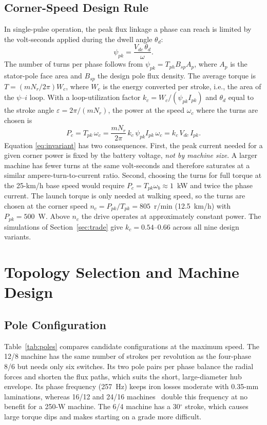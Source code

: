 \documentclass[journal]{IEEEtran}
\begin{document}
\subsection{Corner-Speed Design Rule}
\label{sec:corner}
In single-pulse operation, the peak flux linkage a phase can reach is limited by
the volt-seconds applied during the dwell angle $\theta_d$:
\begin{equation}
\psi_{pk} = \frac{V_{dc}\,\theta_d}{\omega}.
\label{eq:voltsec}
\end{equation}
The number of turns per phase follows from $\psi_{pk}=T_{ph}B_{sp}A_{p}$, where
$A_p$ is the stator-pole face area and $B_{sp}$ the design pole flux density.
The average torque is $T=(mN_r/2\pi)W_c$, where $W_c$ is the energy converted
per stroke, i.e., the area of the $\psi$--$i$ loop. With a loop-utilization
factor $k_c=W_c/(\psi_{pk}I_{pk})$ and $\theta_d$ equal to the stroke angle
$\varepsilon=2\pi/(mN_r)$, the power at the speed $\omega_c$ where the turns are
chosen is
\begin{equation}
P_c = T_{pk}\,\omega_c = \frac{mN_r}{2\pi}\,k_c\,\psi_{pk} I_{pk}\,\omega_c = k_c\,V_{dc}\,I_{pk}.
\label{eq:invariant}
\end{equation}
Equation \eqref{eq:invariant} has two consequences. First, the peak current
needed for a given corner power is fixed by the battery voltage, \emph{not by
machine size}. A larger machine has fewer turns at the same volt-seconds and
therefore saturates at a similar ampere-turn-to-current ratio. Second, choosing
the turns for full torque at the 25-km/h base speed would require
$P_c=T_{pk}\omega_b\approx1$~kW and twice the phase current. The launch torque is
only needed at walking speed, so the turns are chosen at the corner speed
$n_c=P_{pk}/T_{pk}=805$~r/min (12.5~km/h) with $P_{pk}=500$~W. Above $n_c$ the
drive operates at approximately constant power. The simulations of
Section~\ref{sec:trade} give $k_c=0.54$--$0.66$ across all nine design variants.

\section{Topology Selection and Machine Design}

\subsection{Pole Configuration}
Table~\ref{tab:poles} compares candidate configurations at the maximum speed. The
12/8 machine has the same number of strokes per revolution as the four-phase
8/6 but needs only six switches. Its two pole pairs per phase balance the radial
forces and shorten the flux paths, which suits the short, large-diameter hub
envelope. Its phase frequency (257~Hz) keeps iron losses moderate with 0.35-mm
laminations, whereas 16/12 and 24/16 machines~\cite{bilgin2012,jiang2017} double
this frequency at no benefit for a 250-W machine. The 6/4 machine has a
30$^\circ$ stroke, which causes large torque dips and makes starting on a grade
more difficult.
\end{document}
